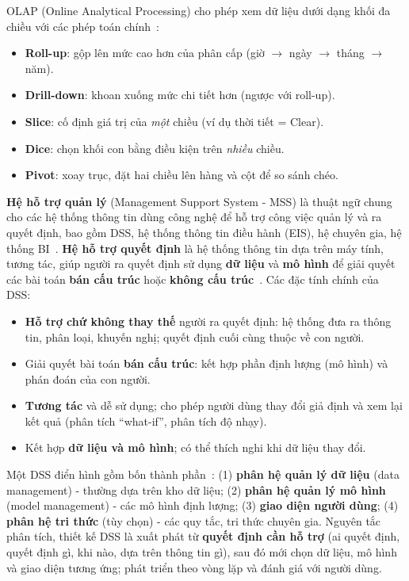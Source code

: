OLAP (Online Analytical Processing) cho phép xem dữ liệu dưới dạng khối đa chiều với các phép toán chính~\cite{han}:
\begin{itemize}
    \item \textbf{Roll-up}: gộp lên mức cao hơn của phân cấp (giờ $\rightarrow$ ngày $\rightarrow$ tháng $\rightarrow$ năm).
    \item \textbf{Drill-down}: khoan xuống mức chi tiết hơn (ngược với roll-up).
    \item \textbf{Slice}: cố định giá trị của \textit{một} chiều (ví dụ thời tiết = Clear).
    \item \textbf{Dice}: chọn khối con bằng điều kiện trên \textit{nhiều} chiều.
    \item \textbf{Pivot}: xoay trục, đặt hai chiều lên hàng và cột để so sánh chéo.
\end{itemize}

\label{sec:theory-dss}
\textbf{Hệ hỗ trợ quản lý} (Management Support System - MSS) là thuật ngữ chung cho các hệ thống thông tin dùng công nghệ để hỗ trợ công việc quản lý và ra quyết định, bao gồm DSS, hệ thống thông tin điều hành (EIS), hệ chuyên gia, hệ thống BI~\cite{turban}. \textbf{Hệ hỗ trợ quyết định} là hệ thống thông tin dựa trên máy tính, tương tác, giúp người ra quyết định sử dụng \textbf{dữ liệu} và \textbf{mô hình} để giải quyết các bài toán \textbf{bán cấu trúc} hoặc \textbf{không cấu trúc}~\cite{turban,sharda}. Các đặc tính chính của DSS:
\begin{itemize}
    \item \textbf{Hỗ trợ chứ không thay thế} người ra quyết định: hệ thống đưa ra thông tin, phân loại, khuyến nghị; quyết định cuối cùng thuộc về con người.
    \item Giải quyết bài toán \textbf{bán cấu trúc}: kết hợp phần định lượng (mô hình) và phán đoán của con người.
    \item \textbf{Tương tác} và dễ sử dụng; cho phép người dùng thay đổi giả định và xem lại kết quả (phân tích ``what-if'', phân tích độ nhạy).
    \item Kết hợp \textbf{dữ liệu và mô hình}; có thể thích nghi khi dữ liệu thay đổi.
\end{itemize}
Một DSS điển hình gồm bốn thành phần~\cite{turban}: (1) \textbf{phân hệ quản lý dữ liệu} (data management) - thường dựa trên kho dữ liệu; (2) \textbf{phân hệ quản lý mô hình} (model management) - các mô hình định lượng; (3) \textbf{giao diện người dùng}; (4) \textbf{phân hệ tri thức} (tùy chọn) - các quy tắc, tri thức chuyên gia. Nguyên tắc phân tích, thiết kế DSS là xuất phát từ \textbf{quyết định cần hỗ trợ} (ai quyết định, quyết định gì, khi nào, dựa trên thông tin gì), sau đó mới chọn dữ liệu, mô hình và giao diện tương ứng; phát triển theo vòng lặp và đánh giá với người dùng.

